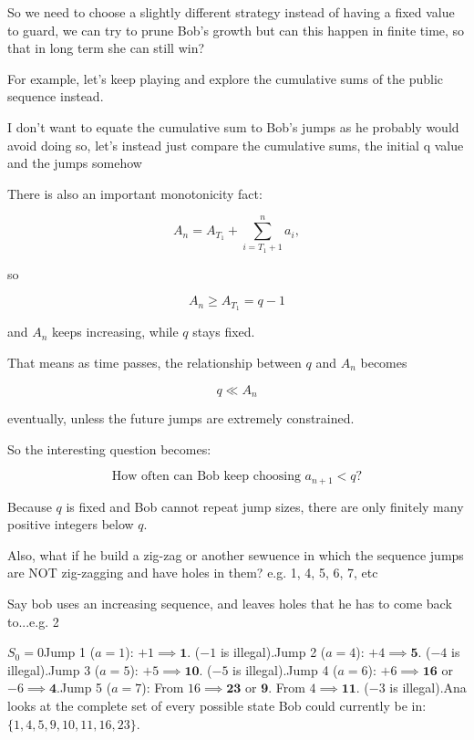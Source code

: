 So we need to choose a slightly different strategy instead of having a fixed value to guard, we can try to prune Bob's growth but can this happen in finite time, so that in long term she can still win? 

\vspace{3mm}

For example, let's keep playing and explore the cumulative sums of the public sequence instead. 

I don't want to equate the cumulative sum to Bob's jumps as he probably would avoid doing so, let's instead just compare the cumulative sums, the initial q value and the jumps somehow

There is also an important monotonicity fact:

$$ A_n=A_{T_1}+\sum_{i=T_1+1}^{n}a_i, $$

so

$$ A_n\ge A_{T_1}=q-1 $$

and \(A_n\) keeps increasing, while \(q\) stays fixed.

That means as time passes, the relationship between \(q\) and \(A_n\) becomes

$$ q\ll A_n $$

eventually, unless the future jumps are extremely constrained.

So the interesting question becomes:

$$ \boxed{\text{How often can Bob keep choosing }a_{n+1}<q?} $$

Because \(q\) is fixed and Bob cannot repeat jump sizes, there are only finitely many positive integers below \(q\).

\vspace{5mm}

Also, what if he build a zig-zag or another sewuence in which the sequence jumps are NOT zig-zagging and have holes in them? e.g. 1, 4, 5, 6, 7, etc 

Say bob uses an increasing sequence, and leaves holes that he has to come back to...e.g. 2

$S_0 = 0$Jump 1 ($a=1$): $+1 \implies \mathbf{1}$. ($-1$ is illegal).Jump 2 ($a=4$): $+4 \implies \mathbf{5}$. ($-4$ is illegal).Jump 3 ($a=5$): $+5 \implies \mathbf{10}$. ($-5$ is illegal).Jump 4 ($a=6$): $+6 \implies \mathbf{16}$ or $-6 \implies \mathbf{4}$.Jump 5 ($a=7$): From $16 \implies \mathbf{23}$ or $\mathbf{9}$. From $4 \implies \mathbf{11}$. ($-3$ is illegal).Ana looks at the complete set of every possible state Bob could currently be in: $\{1, 4, 5, 9, 10, 11, 16, 23\}$.


